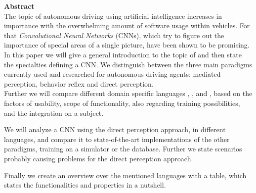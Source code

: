 {\bf\Large Abstract} \\ [1em]
The topic of autonomous driving using artificial intelligence increases in importance with the overwhelming amount of software usage within vehicles. For that \textit{Convolutional Neural Networks} (CNNs), which try to figure out the importance of special areas of a single picture, have been shown to be promising. \\
In this paper we will give a general introduction to the topic of \nns and then state the specialties defining a CNN.
We distinguish between the three main paradigms currently used and researched for autonomous driving agents: mediated perception, behavior reflex and direct perception.\\
Further we will compare different domain specific languages \cnnarch, \caffe, \caffetwo and \mxnet, based on the factors of usability, scope of functionality, also regarding training possibilities, and the integration on a subject.

We will analyze a CNN using the direct perception approach, in different languages, and compare it to state-of-the-art implementations of the other paradigms, training on a simulator \torcs or the \kitti database. Further we state scenarios probably causing problems for the direct perception approach. 

Finally we create an overview over the mentioned languages with a table, which states the functionalities and properties in a nutshell.
\cleardoublepage
